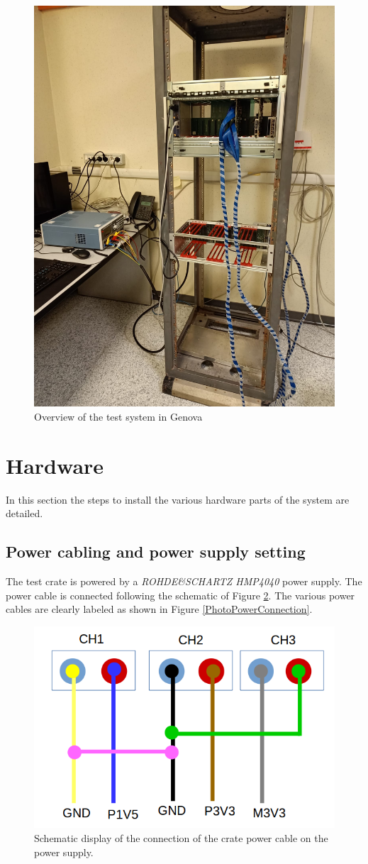 \documentclass[10pt,a4paper]{article}
\begin{document}
\begin{figure}[h!]
\centering
 \includegraphics[width=0.5\linewidth]{TestSystem.jpeg} 
  \caption{Overview of the test system in Genova}
  \label{PhotoTestSystem}
\end{figure}

\section{Hardware}
In this section the steps to install the various hardware parts of the system are detailed.
\subsection{Power cabling and power supply setting}
The test crate is powered by a \emph{ROHDE\&SCHARTZ HMP4040} power supply. The power cable is connected following the schematic of Figure \ref{PowerConnection}. The various power cables are clearly labeled as shown in Figure \ref{PhotoPowerConnection}.
\begin{figure}[h!]
\centering
 \includegraphics[width=0.7\linewidth]{ElectricalPower.png} 
  \caption{Schematic display of the connection of the crate power cable on the power supply.}
  \label{PowerConnection}
\end{figure}
\end{document}
